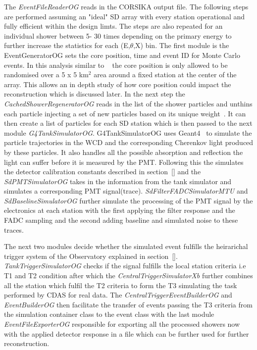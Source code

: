 The \textit{EventFileReaderOG} reads in the CORSIKA output file. The following steps are performed assuming an "ideal" SD array with every station operational and fully efficient within the design limts. The steps are also repeated for an individual shower between 5- 30 times depending on the primary energy to further increase the statistics for each (E,$\theta$,X) bin. The first module is the EventGeneratorOG sets the core position, time and event ID for Monte Carlo events. In this analysis similar to ~\cite{} the core position is only allowed to be randomised over a 5 x 5 km$^2$ area around a fixed station at the center of the array. This allows an in depth study of how core position could impact the reconstruction which is discussed later. In the next step the \textit{CachedShowerRegeneratorOG} reads in the list of the shower particles and unthins each particle injecting a set of new particles based on its unique weight~\cite{}. It can then create a list of particles for each SD station which is then passed to the next module \textit{G4TankSimulatorOG}. G4TankSimulatorOG uses Geant4~\cite{} to simulate the particle trajectories in the WCD and the corresponding Cherenkov light produced by these particles. It also handles all the possible absorption and reflection the light can suffer before it is measured by the PMT. Following this the \textit{} simulates the detector calibration constants described in section~\ref{} and the \textit{SdPMTSimulatorOG} takes in the information from the tank simulator and simulates a corresponding PMT signal(trace). \textit{SdFilterFADCSimulatorMTU} and \textit{SdBaselineSimulatorOG} further simulate the processing of the PMT signal by the electronics at each station with the first applying the filter response and the FADC sampling and the second adding baseline and simulated noise to these traces. 

The next two modules decide whether the simulated event fulfills the heirarichal trigger system of the Observatory explained in section~\ref{}. \textit{TankTriggerSimulatorOG} checks if the signal fulfills the local station criteria i.e T1 and T2 condition after which the \textit{CentralTriggerSimulatorXb} further combines all the station which fulfil the T2 criteria to form the T3 simulating the task performed by CDAS for real data. The \textit{CentralTriggerEventBuilderOG} and \textit{EventBuilderOG} then facilitate the transfer of events passing the T3 criteria from the simulation container class to the event class with the last module \textit{EventFileExporterOG} responsible for exporting all the processed showers now with the applied detector response in a file which can be further used for further reconstruction.  


